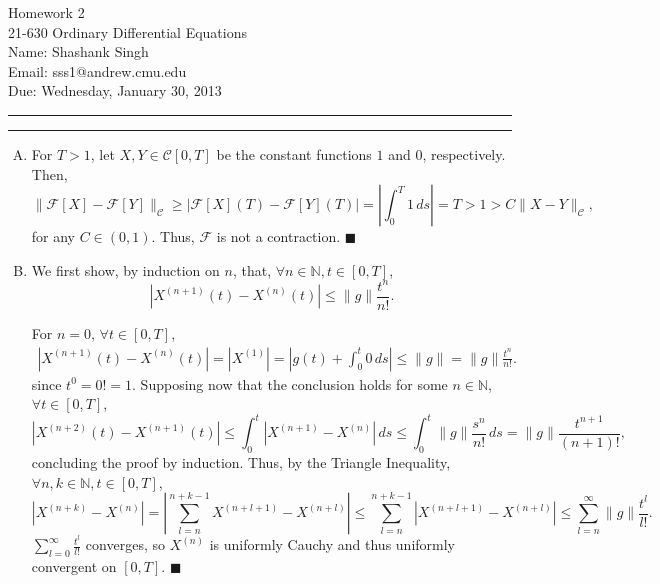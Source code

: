 \documentclass[11pt]{article}
\makeatletter
\newcounter{questionCounter}
\newcounter{partCounter}[questionCounter]
\newenvironment{question}[2][\arabic{questionCounter}]{%
    \setcounter{partCounter}{0}%
    \vspace{.25in} \hrule \vspace{0.5em}%
        \noindent{\bf #2}%
    \vspace{0.8em} \hrule \vspace{.10in}%
    \addtocounter{questionCounter}{1}%
}{}
\newcommand{\myname}{Shashank Singh}
\newcommand{\myandrew}{sss1@andrew.cmu.edu}
\newcommand{\myclass}{21-630 Ordinary Differential Equations}
\newcommand{\myhwnum}{2}
\newcommand{\duedate}{Wednesday, January 30, 2013}
\renewcommand{\qed}{\quad $\blacksquare$}
\newcommand{\N}{\mathbb{N}} %
\newcommand{\F}{\mathcal{F}}
\newcommand{\C}{\mathcal{C}}
\makeatother
\begin{document}
\thispagestyle{plain}

{\Large Homework \myhwnum} \\
\myclass \\
Name: \myname \\
Email: \myandrew \\
Due: \duedate \\
\begin{question}{Problem 1}
\begin{enumerate}[A)]
\item For $T > 1$, let $X,Y \in \C[0,T]$ be the constant functions $1$ and $0$,
respectively. Then,
\[\|\F[X] - \F[Y]\|_{\C}
 \geq |\F[X](T) - \F[Y](T)|
 =    \left| \int_0^T 1 \, ds\right|
 =    T
 >    1
 >    C\|X - Y\|_{\C},
\]
for any $C \in (0,1)$. Thus, $\F$ is not a contraction. \qed

\item We first show, by induction on $n$, that, $\forall n \in \N,
t \in [0,T]$, \[|X^{(n + 1)}(t) - X^{(n)}(t)| \leq \|g\|\frac{t^n}{n!}.\]

For $n = 0$, $\forall t \in [0,T]$,
\begin{align*}
\left| X^{(n + 1)}(t) - X^{(n)}(t) \right|
 =    \left| X^{(1)} \right|
 =    \left| g(t) + \int_0^t 0 \, ds \right|
 \leq \|g\|
 =    \|g\|\frac{t^n}{n!}.
\end{align*}
since $t^0 = 0! = 1$.
Supposing now that the conclusion holds for some $n \in \N$,
$\forall t \in [0,T]$,
\[\left| X^{(n + 2)}(t) - X^{(n + 1)}(t) \right|
 \leq \int_0^t \left| X^{(n + 1)} - X^{(n)} \right| \, ds
 \leq \int_0^t \|g\|\frac{s^n}{n!} \, ds
 =    \|g\|\frac{t^{n + 1}}{(n + 1)!},\]
concluding the proof by induction. Thus, by the Triangle Inequality, $\forall
n,k \in \N, t \in [0,T]$,
\[|X^{(n + k)} - X^{(n)}|
 = \left| \sum_{l = n}^{n + k - 1} X^{(n + l + 1)} - X^{(n + l)} \right|
 \leq \sum_{l = n}^{n + k - 1} \left| X^{(n + l + 1)} - X^{(n + l)} \right|
 \leq \sum_{l = n}^{\infty} \|g\|\frac{t^l}{l!}.
\]
$\sum_{l = 0}^{\infty} \frac{t^l}{l!}$ converges, so $X^{(n)}$ is uniformly
Cauchy and thus uniformly convergent on $[0,T]$. \qed
\end{enumerate}
\end{question}
\end{document}
